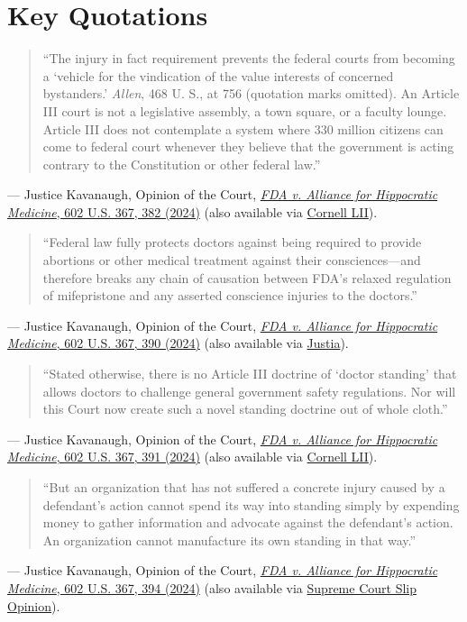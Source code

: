 \documentclass[12pt]{article}
\begin{document}
\section{Key Quotations}

\begin{quote}
``The injury in fact requirement prevents the federal courts from becoming a `vehicle for the vindication of the value interests of concerned bystanders.' \textit{Allen}, 468 U. S., at 756 (quotation marks omitted). An Article III court is not a legislative assembly, a town square, or a faculty lounge. Article III does not contemplate a system where 330 million citizens can come to federal court whenever they believe that the government is acting contrary to the Constitution or other federal law.''
\end{quote}
\noindent --- Justice Kavanaugh, Opinion of the Court, \href{https://www.supremecourt.gov/opinions/23pdf/602us1r35_bqmd.pdf}{\textit{FDA v. Alliance for Hippocratic Medicine}, 602 U.S. 367, 382 (2024)} (also available via \href{https://www.law.cornell.edu/supremecourt/text/23-235}{Cornell LII}).

\begin{quote}
``Federal law fully protects doctors against being required to provide abortions or other medical treatment against their consciences---and therefore breaks any chain of causation between FDA's relaxed regulation of mifepristone and any asserted conscience injuries to the doctors.''
\end{quote}
\noindent --- Justice Kavanaugh, Opinion of the Court, \href{https://www.supremecourt.gov/opinions/23pdf/602us1r35_bqmd.pdf}{\textit{FDA v. Alliance for Hippocratic Medicine}, 602 U.S. 367, 390 (2024)} (also available via \href{https://supreme.justia.com/cases/federal/us/602/23-235/}{Justia}).

\begin{quote}
``Stated otherwise, there is no Article III doctrine of `doctor standing' that allows doctors to challenge general government safety regulations. Nor will this Court now create such a novel standing doctrine out of whole cloth.''
\end{quote}
\noindent --- Justice Kavanaugh, Opinion of the Court, \href{https://www.supremecourt.gov/opinions/23pdf/602us1r35_bqmd.pdf}{\textit{FDA v. Alliance for Hippocratic Medicine}, 602 U.S. 367, 391 (2024)} (also available via \href{https://www.law.cornell.edu/supremecourt/text/23-235}{Cornell LII}).

\begin{quote}
``But an organization that has not suffered a concrete injury caused by a defendant's action cannot spend its way into standing simply by expending money to gather information and advocate against the defendant's action. An organization cannot manufacture its own standing in that way.''
\end{quote}
\noindent --- Justice Kavanaugh, Opinion of the Court, \href{https://www.supremecourt.gov/opinions/23pdf/602us1r35_bqmd.pdf}{\textit{FDA v. Alliance for Hippocratic Medicine}, 602 U.S. 367, 394 (2024)} (also available via \href{https://www.supremecourt.gov/opinions/23pdf/23-235_n7ip.pdf}{Supreme Court Slip Opinion}).
\end{document}
